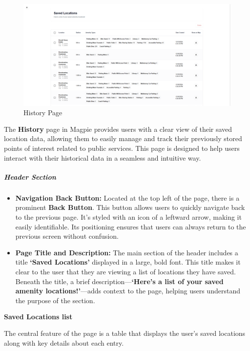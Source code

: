 \begin{figure}[htbp]
    \centering{}
    \includegraphics[width=1\textwidth]{images/site/history/history_page.png}
    \caption{History Page}
\end{figure}

The \textbf{History} page in Magpie provides users with a clear view of their
saved location data, allowing them to easily manage and track their previously
stored points of interest related to public services. This page is designed to
help users interact with their historical data in a seamless and intuitive way.

\subparagraph{Header Section}\mbox{}

\begin{itemize}
    \item{} \textbf{Navigation Back Button:} Located at the top left of the
    page, there is a prominent \textbf{Back Button}. This button allows users to
    quickly navigate back to the previous page. It's styled with an icon of a
    leftward arrow, making it easily identifiable. Its positioning ensures that
    users can always return to the previous screen without confusion.
    \item{} \textbf{Page Title and Description:} The main section of the header
    includes a title \textbf{`Saved Locations'} displayed in a large, bold font.
    This title makes it clear to the user that they are viewing a list of
    locations they have saved. Beneath the title, a brief
    description—\textbf{`Here's a list of your saved amenity locations!'}—adds
    context to the page, helping users understand the purpose of the section.
\end{itemize}

\textbf{Saved Locations list}

The central feature of the page is a table that displays the user's saved
locations along with key details about each entry.

